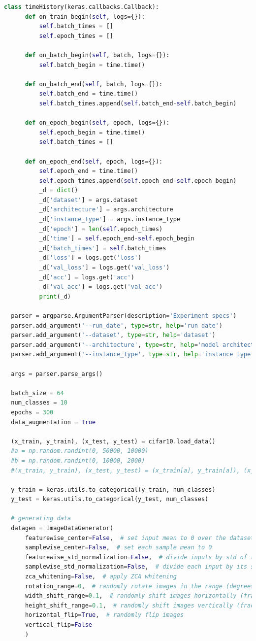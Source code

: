 \documentclass[12pt,a4paper,twoside]{article}
\begin{document}
\begin{appendices}
\begin{lstlisting}[language=python]
  class timeHistory(keras.callbacks.Callback):
      def on_train_begin(self, logs={}):
          self.batch_times = []
          self.epoch_times = []

      def on_batch_begin(self, batch, logs={}):
          self.batch_begin = time.time()

      def on_batch_end(self, batch, logs={}):
          self.batch_end = time.time()
          self.batch_times.append(self.batch_end-self.batch_begin)

      def on_epoch_begin(self, epoch, logs={}):
          self.epoch_begin = time.time()
          self.batch_times = []

      def on_epoch_end(self, epoch, logs={}):
          self.epoch_end = time.time()
          self.epoch_times.append(self.epoch_end-self.epoch_begin)
          _d = dict()
          _d['dataset'] = args.dataset
          _d['architecture'] = args.architecture
          _d['instance_type'] = args.instance_type
          _d['epoch'] = len(self.epoch_times)
          _d['time'] = self.epoch_end-self.epoch_begin
          _d['batch_times'] = self.batch_times
          _d['loss'] = logs.get('loss')
          _d['val_loss'] = logs.get('val_loss')
          _d['acc'] = logs.get('acc')
          _d['val_acc'] = logs.get('val_acc')
          print(_d)

  parser = argparse.ArgumentParser(description='Experiment specs')
  parser.add_argument('--run_date', type=str, help='run date')
  parser.add_argument('--dataset', type=str, help='dataset')
  parser.add_argument('--architecture', type=str, help='model architecture')
  parser.add_argument('--instance_type', type=str, help='instance type')

  args = parser.parse_args()

  batch_size = 64
  num_classes = 10
  epochs = 300
  data_augmentation = True

  (x_train, y_train), (x_test, y_test) = cifar10.load_data()
  #a = np.random.randint(0, 50000, 10000)
  #b = np.random.randint(0, 10000, 2000)
  #(x_train, y_train), (x_test, y_test) = (x_train[a], y_train[a]), (x_test[b], y_test[b])

  y_train = keras.utils.to_categorical(y_train, num_classes)
  y_test = keras.utils.to_categorical(y_test, num_classes)

  # generating data
  datagen = ImageDataGenerator(
      featurewise_center=False,  # set input mean to 0 over the dataset
      samplewise_center=False,  # set each sample mean to 0
      featurewise_std_normalization=False,  # divide inputs by std of the dataset
      samplewise_std_normalization=False,  # divide each input by its std
      zca_whitening=False,  # apply ZCA whitening
      rotation_range=0,  # randomly rotate images in the range (degrees, 0 to 180)
      width_shift_range=0.1,  # randomly shift images horizontally (fraction of total width)
      height_shift_range=0.1,  # randomly shift images vertically (fraction of total height)
      horizontal_flip=True,  # randomly flip images
      vertical_flip=False
      )


\end{lstlisting}
\end{appendices}
\end{document}
